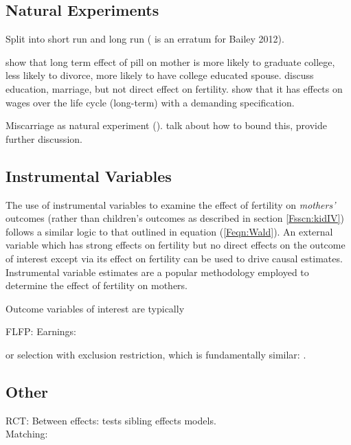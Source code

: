 \subsection{Natural Experiments}
\label{Fsscn:motherNExp}
Split into short run and long run
\citet{Bailey2011,Bailey2006,Bailey2013,Bailey2012,Christensen2012,
Guldi2008,KearnerLevine2009,Levineetal1999,AngristEvans1996,
Jacobsenetal1999,AngristEvans1998,Cristia2008}
(\citet{Bailey2009} is an erratum for Bailey 2012).

\citet{OltmansHungerman2012} show that long term effect of pill on mother is
more likely to graduate college, less likely to divorce, more likely to have
college educated spouse.  \citet{GoldinKatz2002a} discuss education, marriage,
but not direct effect on fertility. \citet{Baileyetal2012} show that it has
effects on wages over the life cycle (long-term) with a demanding specification.

Miscarriage as natural experiment (\citet{Hotzetal2005,Fletcher2012}).  
\citet{Hotzetal1997} talk about how to bound this, \citet{FletcherWolfe2009} 
provide further discussion.


\subsection{Instrumental Variables}
The use of instrumental variables to examine the effect of fertility on 
\emph{mothers'} outcomes (rather than children's outcomes as described
in section \ref{Fsscn:kidIV}) follows a similar logic to that outlined in
equation (\ref{Feqn:Wald}).  An external variable which has strong effects
on fertility but no direct effects on the outcome of interest except via its
effect on fertility can be used to drive causal estimates.  Instrumental 
variable estimates are a popular methodology employed to determine the 
effect of fertility on mothers.

Outcome variables of interest are typically 

FLFP: \citet{AgueroMarks2008,AgueroMarks2011,ChunOh2002,Caceres2008}
Earnings:

\citet{Ananatetal2009,Miller2011,
BronarsGrogger1994,KimAassve2006,RosenzweigSchultz1987,
Caceres2006,Hotzetal1997}
or selection with exclusion restriction, which is fundamentally similar: 
\citet{Ribar1994}.

\subsection{Other}
RCT: \citet{DiCensoetal2002}
Between effects: \citet{Holmlund2005,GeronimusKorenman1992} \citet{Ribar1999} 
tests sibling effects models.\\
Matching: \citet{ChevalierViitanen2003,LevinePainter2003}


